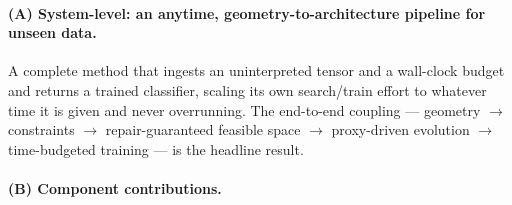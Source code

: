 \documentclass[10pt,twocolumn]{article}
\begin{document}
\paragraph{(A) System-level: an anytime, geometry-to-architecture pipeline for
unseen data.} A complete method that ingests an uninterpreted tensor and a
wall-clock budget and returns a trained classifier, scaling its own
search/train effort to whatever time it is given and never overrunning. The
end-to-end coupling --- geometry $\rightarrow$ constraints $\rightarrow$
repair-guaranteed feasible space $\rightarrow$ proxy-driven evolution
$\rightarrow$ time-budgeted training --- is the headline result.

\paragraph{(B) Component contributions.}
\end{document}
